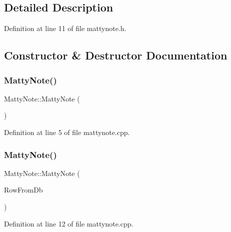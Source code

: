 \subsection{Detailed Description}


Definition at line 11 of file mattynote.\+h.



\subsection{Constructor \& Destructor Documentation}
\hypertarget{classMattyNote_a8c09bf366e6973bc1c4f4d5daa792899}{}\label{classMattyNote_a8c09bf366e6973bc1c4f4d5daa792899} 
\subsubsection{\texorpdfstring{Matty\+Note()}{MattyNote()}\hspace{0.1cm}{\footnotesize\ttfamily [1/2]}}
{\footnotesize\ttfamily Matty\+Note\+::\+Matty\+Note (\begin{DoxyParamCaption}{ }\end{DoxyParamCaption})}



Definition at line 5 of file mattynote.\+cpp.

\hypertarget{classMattyNote_a101e9c2475ee2567dfa2e168b543806f}{}\label{classMattyNote_a101e9c2475ee2567dfa2e168b543806f} 
\subsubsection{\texorpdfstring{Matty\+Note()}{MattyNote()}\hspace{0.1cm}{\footnotesize\ttfamily [2/2]}}
{\footnotesize\ttfamily Matty\+Note\+::\+Matty\+Note (\begin{DoxyParamCaption}\item[{Q\+String\+List}]{Row\+From\+Db }\end{DoxyParamCaption})}



Definition at line 12 of file mattynote.\+cpp.

